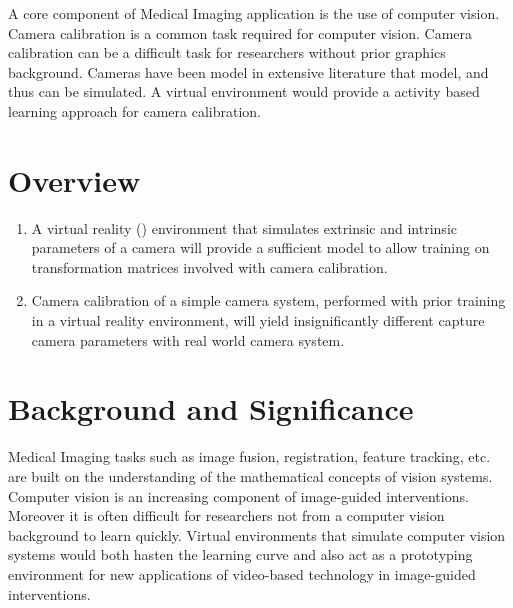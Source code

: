 \documentclass[11pt]{report}
\begin{document}
A core component of Medical Imaging application is the use of computer vision. Camera calibration is a common task required for computer vision. Camera calibration can be a difficult task for researchers without prior graphics background. Cameras have been model in extensive literature that model, and thus can be simulated. A virtual environment would provide a activity based learning approach for camera calibration. 
     
\section{Overview}

     
\begin{enumerate}
\item A virtual reality () environment that simulates extrinsic and intrinsic parameters of a camera will provide a sufficient model to allow training on transformation matrices involved with camera calibration.
\item Camera calibration of a simple camera system, performed with prior training in a virtual reality environment, will yield insignificantly different capture camera parameters with real world camera system. 
\end{enumerate}

\section{Background and Significance}

Medical Imaging tasks such as image fusion, registration, feature tracking, etc. are built on the understanding of the mathematical concepts of vision systems. Computer vision is an increasing component of image-guided interventions. Moreover it is often difficult for researchers not from a computer vision background to learn quickly. Virtual environments that simulate computer vision systems would both hasten the learning curve and also act as a prototyping environment for new applications of video-based technology in image-guided interventions. 

\end{document}
